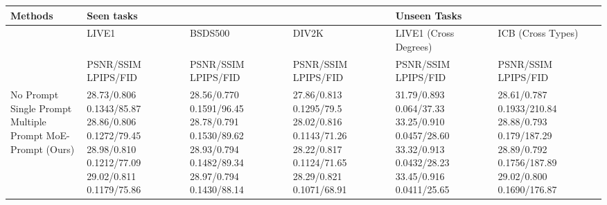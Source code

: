 \begin{tabular}{llllll}
\toprule
Methods & Seen tasks &  &  & Unseen Tasks &  \\
\midrule
 & LIVE1 & BSDS500 & DIV2K & LIVE1 (Cross Degrees) & ICB (Cross Types) \\
 & PSNR/SSIM LPIPS/FID & PSNR/SSIM LPIPS/FID & PSNR/SSIM LPIPS/FID & PSNR/SSIM LPIPS/FID & PSNR/SSIM LPIPS/FID \\
No Prompt Single Prompt Multiple Prompt MoE-Prompt (Ours) & 28.73/0.806 0.1343/85.87 28.86/0.806 0.1272/79.45 28.98/0.810 0.1212/77.09 29.02/0.811 0.1179/75.86 & 28.56/0.770 0.1591/96.45 28.78/0.791 0.1530/89.62 28.93/0.794 0.1482/89.34 28.97/0.794 0.1430/88.14 & 27.86/0.813 0.1295/79.5 28.02/0.816 0.1143/71.26 28.22/0.817 0.1124/71.65 28.29/0.821 0.1071/68.91 & 31.79/0.893 0.064/37.33 33.25/0.910 0.0457/28.60 33.32/0.913 0.0432/28.23 33.45/0.916 0.0411/25.65 & 28.61/0.787 0.1933/210.84 28.88/0.793 0.179/187.29 28.89/0.792 0.1756/187.89 29.02/0.800 0.1690/176.87 \\
\bottomrule
\end{tabular}
